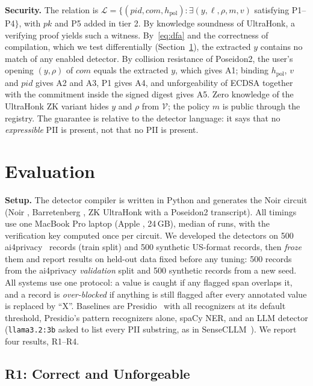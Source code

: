 \documentclass[conference]{IEEEtran}
\begin{document}
\textbf{Security.} The relation is $\mathcal{L} = \{(\mathit{pid}, \mathit{com}, h_{\mathrm{pol}}) : \exists (y, \ell, \rho, m, v)$ satisfying P1--P4$\}$, with $pk$ and P5 added in tier 2. By knowledge soundness of UltraHonk, a verifying proof yields such a witness. By~\eqref{eq:dfa} and the correctness of compilation, which we test differentially (Section~\ref{sec:eval}), the extracted $y$ contains no match of any enabled detector. By collision resistance of Poseidon2, the user's opening $(y, \rho)$ of $\mathit{com}$ equals the extracted $y$, which gives A1; binding $h_{\mathrm{pol}}$, $v$ and $\mathit{pid}$ gives A2 and A3, P1 gives A4, and unforgeability of ECDSA together with the commitment inside the signed digest gives A5. Zero knowledge of the UltraHonk ZK variant hides $y$ and $\rho$ from $\mathcal{V}$; the policy $m$ is public through the registry. The guarantee is relative to the detector language: it says that no \emph{expressible} PII is present, not that no PII is present.

\section{Evaluation}
\label{sec:eval}

\textbf{Setup.} The detector compiler is written in Python and generates the Noir circuit (Noir \nargoVer{}, Barretenberg \bbVer{}, ZK UltraHonk with a Poseidon2 transcript). All timings use one MacBook Pro laptop (Apple \hwName{}, 24\,GB), median of \benchRuns{} runs, with the verification key computed once per circuit. We developed the detectors on 500 ai4privacy~\cite{ai4privacy} records (train split) and 500 synthetic US-format records, then \emph{froze} them and report results on held-out data fixed before any tuning: 500 records from the ai4privacy \emph{validation} split and 500 synthetic records from a new seed. All systems use one protocol: a value is caught if any flagged span overlaps it, and a record is \emph{over-blocked} if anything is still flagged after every annotated value is replaced by ``X''. Baselines are Presidio~\cite{presidio} with all recognizers at its default threshold, Presidio's pattern recognizers alone, spaCy NER, and an LLM detector (\texttt{llama3.2:3b} asked to list every PII substring, as in SenseCLLM~\cite{sensecllm}). We report four results, R1--R4.



\subsection{R1: Correct and Unforgeable}
\end{document}

